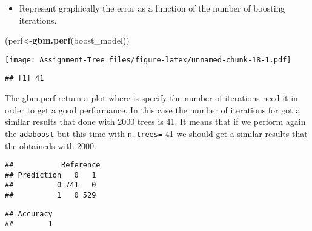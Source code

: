 \documentclass[
]{article}
\newenvironment{Shaded}{\begin{snugshade}}{\end{snugshade}}
\newcommand{\DataTypeTok}[1]{\textcolor[rgb]{0.13,0.29,0.53}{#1}}
\newcommand{\DecValTok}[1]{\textcolor[rgb]{0.00,0.00,0.81}{#1}}
\newcommand{\KeywordTok}[1]{\textcolor[rgb]{0.13,0.29,0.53}{\textbf{#1}}}
\newcommand{\NormalTok}[1]{#1}
\newcommand{\OperatorTok}[1]{\textcolor[rgb]{0.81,0.36,0.00}{\textbf{#1}}}
\newcommand{\StringTok}[1]{\textcolor[rgb]{0.31,0.60,0.02}{#1}}
\providecommand{\tightlist}{%
  \setlength{\itemsep}{0pt}\setlength{\parskip}{0pt}}
\begin{document}
\begin{itemize}
\tightlist
\item
  Represent graphically the error as a function of the number of
  boosting iterations.
\end{itemize}

\begin{Shaded}
\begin{Highlighting}[]
\NormalTok{(perf<-}\KeywordTok{gbm.perf}\NormalTok{(boost_model))}
\end{Highlighting}
\end{Shaded}

\texttt{[image: Assignment-Tree\_files/figure-latex/unnamed-chunk-18-1.pdf]}

\begin{verbatim}
## [1] 41
\end{verbatim}

The gbm.perf return a plot where is specify the number of iterations
need it in order to get a good performance. In this case the number of
iterations for got a similar results that done with 2000 trees is 41. It
means that if we perform again the \texttt{adaboost} but this time with
\texttt{n.trees=} 41 we should get a similar results that the obtaineds
with 2000.

\begin{Shaded}
\end{Shaded}

\begin{verbatim}
##           Reference
## Prediction   0   1
##          0 741   0
##          1   0 529
\end{verbatim}

\begin{verbatim}
## Accuracy 
##        1
\end{verbatim}
\end{document}
